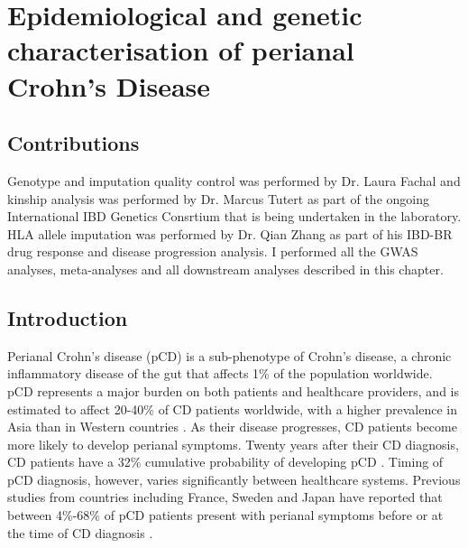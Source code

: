
\chapter{Epidemiological and genetic characterisation of perianal Crohn's Disease}

\ifpdf
    \graphicspath{{Chapter4/Figs/Raster/}{Chapter4/Figs/PDF/}{Chapter4/Figs/}}
\else
    \graphicspath{{Chapter4/Figs/Vector/}{Chapter4/Figs/}}
\fi
\section{Contributions}
Genotype and imputation quality control was performed by Dr. Laura Fachal and kinship analysis was performed by Dr. Marcus Tutert as part of the ongoing International IBD Genetics Consrtium that is being undertaken in the laboratory. HLA allele imputation was performed by Dr. Qian Zhang as part of his IBD-BR drug response and disease progression analysis. I performed all the GWAS analyses, meta-analyses and all downstream analyses described in this chapter.
\section{Introduction}
Perianal Crohn's disease (pCD) is a sub-phenotype of Crohn's disease, a chronic inflammatory disease of the gut that affects 1\% of the population worldwide. pCD represents a major burden on both patients and healthcare providers, and is estimated to affect 20-40\% of CD patients worldwide, with a higher prevalence in Asia than in Western countries \cite{Ng2016-al}. As their disease progresses, CD patients become more likely to develop perianal symptoms. Twenty years after their CD diagnosis, CD patients have a 32\% cumulative probability of developing pCD \cite{Brochard2022-hx}. Timing of pCD diagnosis, however, varies significantly between healthcare systems. Previous studies from countries including France, Sweden and Japan have reported that between 4\%-68\% of pCD patients present with perianal symptoms before or at the time of CD diagnosis \cite{Mizushima2021-hk,Pogacnik2019-aj,Wils2021-ao}.\\

